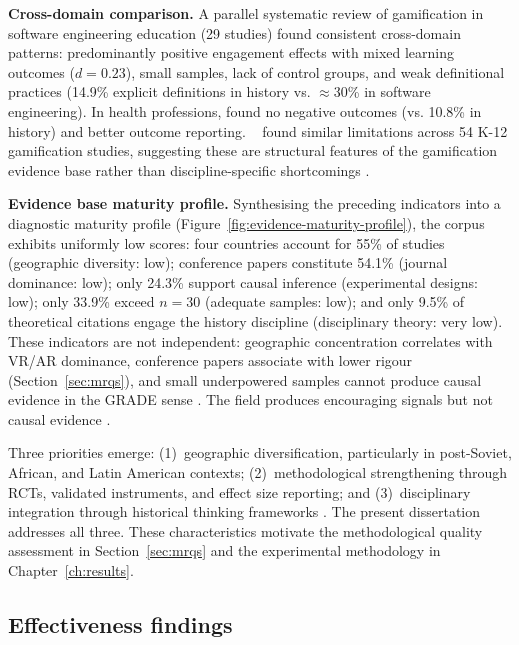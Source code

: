 \textbf{Cross-domain comparison.}
A parallel systematic review of gamification in software engineering education \citep{Korniienko2025aredu} (29 studies) found consistent cross-domain patterns: predominantly positive engagement effects with mixed learning outcomes ($d = 0.23$), small samples, lack of control groups, and weak definitional practices (14.9\% explicit definitions in history vs. ${\approx}$30\% in software engineering). In health professions, \cite{vanGaalen2021} found no negative outcomes (vs. 10.8\% in history) and better outcome reporting. \citeauthor{Dehghanzadeh2024}~\cite{Dehghanzadeh2024} found similar limitations across 54 K-12 gamification studies, suggesting these are structural features of the gamification evidence base rather than discipline-specific shortcomings \cite{DichevDicheva2017, KoivistoHamari2019, Korniienko2025aredu}.

\textbf{Evidence base maturity profile.} \label{sec:evidence-maturity}
Synthesising the preceding indicators into a diagnostic maturity profile (Figure~\ref{fig:evidence-maturity-profile}), the corpus exhibits uniformly low scores: four countries account for 55\% of studies (geographic diversity: low); conference papers constitute 54.1\% (journal dominance: low); only 24.3\% support causal inference (experimental designs: low); only 33.9\% exceed $n = 30$ (adequate samples: low); and only 9.5\% of theoretical citations engage the history discipline (disciplinary theory: very low). These indicators are not independent: geographic concentration correlates with VR/AR dominance, conference papers associate with lower rigour (Section~\ref{sec:mrqs}), and small underpowered samples cannot produce causal evidence in the GRADE sense \cite{GuyattGRADE2008}. The field produces encouraging signals but not causal evidence \cite{DichevDicheva2017, KoivistoHamari2019}.



Three priorities emerge: (1)~geographic diversification, particularly in post-Soviet, African, and Latin American contexts; (2)~methodological strengthening through RCTs, validated instruments, and effect size reporting; and (3)~disciplinary integration through historical thinking frameworks \cite{KorniienkoSemerikov2024}. The present dissertation addresses all three. These characteristics motivate the methodological quality assessment in Section~\ref{sec:mrqs} and the experimental methodology in Chapter~\ref{ch:results}.

\subsection{Effectiveness findings} \label{sec:effectiveness}

